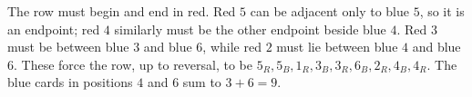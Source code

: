 The row must begin and end in red. Red $5$ can be adjacent only to blue $5$, so it is an endpoint; red $4$ similarly must be the other endpoint beside blue $4$. Red $3$ must be between blue $3$ and blue $6$, while red $2$ must lie between blue $4$ and blue $6$. These force the row, up to reversal, to be $5_R,5_B,1_R,3_B,3_R,6_B,2_R,4_B,4_R$. The blue cards in positions $4$ and $6$ sum to $3+6=\boxed9$.
